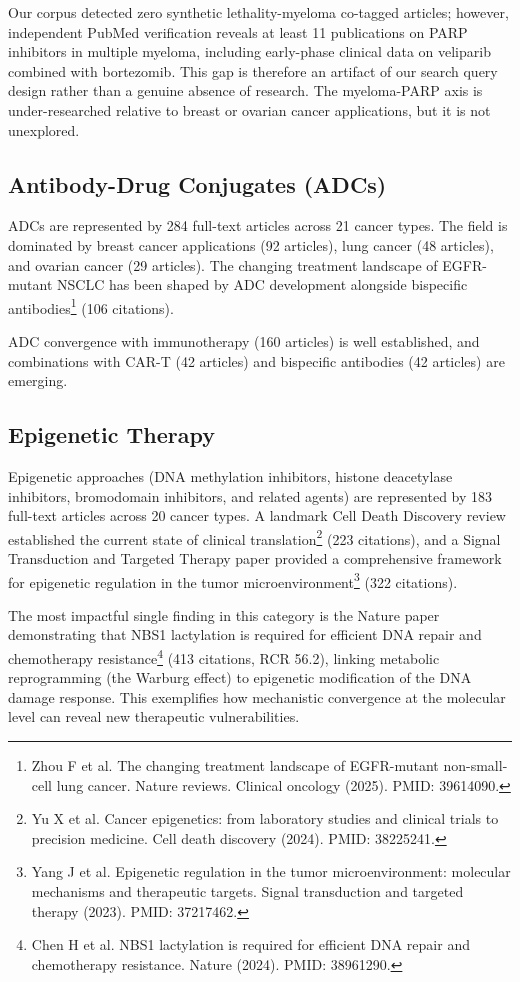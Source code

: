\documentclass[11pt,twoside,openright]{report}
\begin{document}
Our corpus detected zero synthetic lethality-myeloma co-tagged articles; however, independent PubMed verification reveals at least 11 publications on PARP inhibitors in multiple myeloma, including early-phase clinical data on veliparib combined with bortezomib. This gap is therefore an artifact of our search query design rather than a genuine absence of research. The myeloma-PARP axis is under-researched relative to breast or ovarian cancer applications, but it is not unexplored.

\subsection{Antibody-Drug Conjugates (ADCs)}

ADCs are represented by 284 full-text articles across 21 cancer types. The field is dominated by breast cancer applications (92 articles), lung cancer (48 articles), and ovarian cancer (29 articles). The changing treatment landscape of EGFR-mutant NSCLC has been shaped by ADC development alongside bispecific antibodies\footnote{Zhou F et al. The changing treatment landscape of EGFR-mutant non-small-cell lung cancer. Nature reviews. Clinical oncology (2025). PMID: 39614090.} (106 citations).

ADC convergence with immunotherapy (160 articles) is well established, and combinations with CAR-T (42 articles) and bispecific antibodies (42 articles) are emerging.

\subsection{Epigenetic Therapy}

Epigenetic approaches (DNA methylation inhibitors, histone deacetylase inhibitors, bromodomain inhibitors, and related agents) are represented by 183 full-text articles across 20 cancer types. A landmark Cell Death Discovery review established the current state of clinical translation\footnote{Yu X et al. Cancer epigenetics: from laboratory studies and clinical trials to precision medicine. Cell death discovery (2024). PMID: 38225241.} (223 citations), and a Signal Transduction and Targeted Therapy paper provided a comprehensive framework for epigenetic regulation in the tumor microenvironment\footnote{Yang J et al. Epigenetic regulation in the tumor microenvironment: molecular mechanisms and therapeutic targets. Signal transduction and targeted therapy (2023). PMID: 37217462.} (322 citations).

The most impactful single finding in this category is the Nature paper demonstrating that NBS1 lactylation is required for efficient DNA repair and chemotherapy resistance\footnote{Chen H et al. NBS1 lactylation is required for efficient DNA repair and chemotherapy resistance. Nature (2024). PMID: 38961290.} (413 citations, RCR 56.2), linking metabolic reprogramming (the Warburg effect) to epigenetic modification of the DNA damage response. This exemplifies how mechanistic convergence at the molecular level can reveal new therapeutic vulnerabilities.
\end{document}
